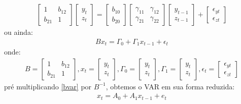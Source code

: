 \documentclass[11pt,a4paper]{article}
\begin{document}
\begin{align*}
\begin{bmatrix}
1 & b_{12} \\
b_{21} & 1 
\end{bmatrix}
\begin{bmatrix}
y_t \\
z_t
\end{bmatrix}
=
\begin{bmatrix}
b_{10}\\
b_{20}
\end{bmatrix}
\begin{bmatrix}
\gamma_{11} & \gamma_{12} \\
\gamma_{21} & \gamma_{22}
\end{bmatrix}
\begin{bmatrix}
y_{t-1}\\
z_{t-1}
\end{bmatrix}
+
\begin{bmatrix}
\epsilon_{yt}\\
\epsilon_{zt}
\end{bmatrix}
\end{align*}
\noindent
ou ainda:
\begin{align} \label{bvar}
Bx_t = \Gamma_0 + \Gamma_1 x_{t-1} + \epsilon_t
\end{align}
\noindent
onde:
\begin{align*}
B= \begin{bmatrix}
1 & b_{12} \\
b_{21} & 1 
\end{bmatrix}, x_t = \begin{bmatrix}
y_t \\
z_t
\end{bmatrix}, \Gamma_0 = \begin{bmatrix}
y_t \\
z_t
\end{bmatrix}, \Gamma_1 = \begin{bmatrix}
y_t \\
z_t
\end{bmatrix}, \epsilon_t = \begin{bmatrix}
\epsilon_{yt}\\
\epsilon_{zt}
\end{bmatrix}
\end{align*}
\noindent
pré multiplicando \ref{bvar} por $B^{-1}$, obtemos o VAR em sua forma reduzida:
\begin{align} \label{varreduzido}
x_t = A_0 + A_1 x_{t-1} + e_t
\end{align}
\end{document}
